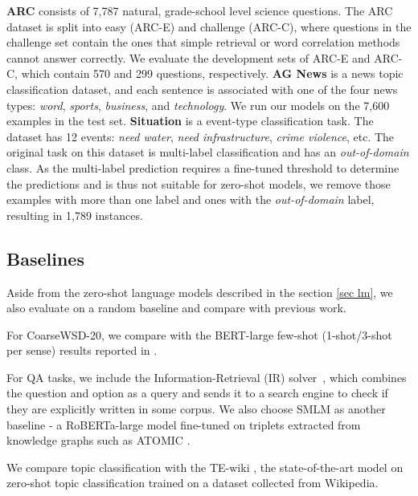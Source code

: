 \documentclass[11pt]{article}
\begin{document}
\medbreak
\noindent\textbf{ARC} \cite{Clark2018ThinkYH} consists of 7,787 natural, grade-school level science questions. The ARC dataset is split into easy (ARC-E) and challenge (ARC-C), where questions in the challenge set contain the ones that simple retrieval or word correlation methods cannot answer correctly. We evaluate the development sets of ARC-E and ARC-C, which contain 570 and 299 questions, respectively.
\medbreak
\noindent\textbf{AG News} \cite{zhang2015character} is a news topic classification dataset, and each sentence is associated with one of the four news types: \textit{word}, \textit{sports}, \textit{business}, and \textit{technology}. We run our models on the 7,600 examples in the test set.
\medbreak
\noindent \textbf{Situation} \cite{mayhew2018university} is a event-type classification task. The dataset has 12 events: \textit{need water}, \textit{need infrastructure}, \textit{crime violence}, etc. The original task on this dataset is multi-label classification and has an \textit{out-of-domain} class. As the multi-label prediction requires a fine-tuned threshold to determine the predictions and is thus not suitable for zero-shot models, we remove those examples with more than one label and ones with the \textit{out-of-domain} label, resulting in 1,789 instances.

\subsection{Baselines}
Aside from the zero-shot language models described in the section \ref{sec lm}, we also evaluate on a random baseline and compare with previous work.

For CoarseWSD-20, we compare with the BERT-large few-shot (1-shot/3-shot per sense) results reported in \citet{loureiro2021analysis}. 

For QA tasks, we include the Information-Retrieval (IR) solver~\cite{clark2016combining}, which combines the question and option as a query and sends it to a search engine to check if they are explicitly written in some corpus. We also choose SMLM \cite{banerjee-baral-2020-self} as another baseline - a RoBERTa-large model fine-tuned on triplets extracted from knowledge graphs such as ATOMIC \cite{sap2019atomic}.

We compare topic classification with the TE-wiki \cite{ding-etal-2022-towards-open}, the state-of-the-art model on zero-shot topic classification trained on a dataset collected from Wikipedia. 
\end{document}
